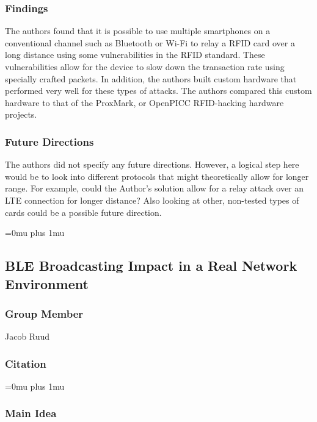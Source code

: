 \subsubsection{Findings}

\noindent
The authors found that it is possible to use multiple smartphones on a conventional channel such as Bluetooth or Wi-Fi to relay a RFID card over a long distance using some vulnerabilities in the RFID standard.  These vulnerabilities allow for the device to slow down the transaction rate using specially crafted packets. In addition, the authors built custom hardware that performed very well for these types of attacks.  The authors compared this custom hardware to that of the ProxMark, or OpenPICC RFID-hacking hardware projects.

\subsubsection{Future Directions}

\noindent
The authors did not specify any future directions.  However, a logical step here would be to look into different protocols that might theoretically allow for longer range.  For example, could the Author's solution allow for a relay attack over an LTE connection for longer distance?  Also looking at other, non-tested types of cards could be a possible future direction.

\Urlmuskip=0mu plus 1mu\relax

\noindent
\subsection{{BLE} {B}roadcasting {I}mpact in a {R}eal {N}etwork {E}nvironment}

\subsubsection{Group Member}

\noindent
Jacob Ruud

\noindent
\subsubsection{Citation}

\Urlmuskip=0mu plus 1mu\relax

\subsubsection{Main Idea}

